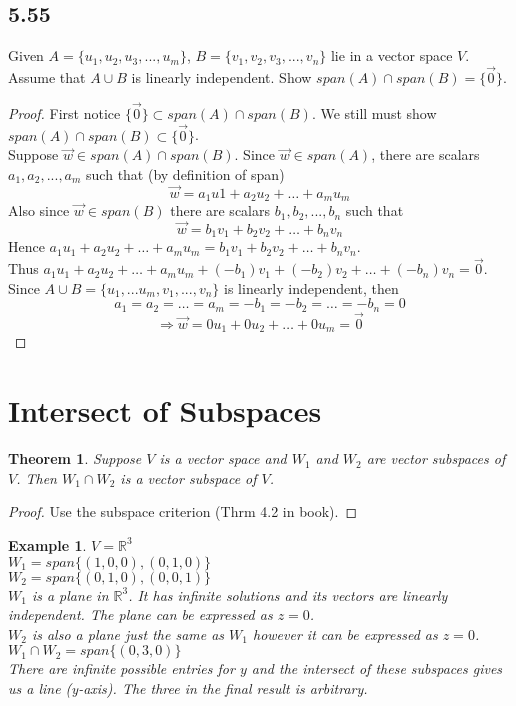 \documentclass{report}
\newtheorem*{ex}{Example}
\newtheorem*{thrm}{Theorem}
\begin{document}
\subsection{5.55}
Given $A=\{u_1,u_2,u_3,...,u_m\}$, $B=\{v_1,v_2,v_3,...,v_n\}$ lie in a vector space $V$. Assume that $A\cup B$ is linearly independent. Show $span(A)\cap span(B) = \{\vec{0}\}$.
\begin{proof}
First notice $\{\vec{0}\} \subset span(A) \cap span(B)$. We still must show $span(A) \cap span(B) \subset \{\vec{0}\}$.\\
Suppose $\vec{w}\in span(A) \cap span(B)$. Since $\vec{w}\in span(A)$, there are scalars $a_1,a_2,...,a_m$ such that (by definition of span)
\[ \vec{w}=a_1u1+a_2u_2+\dots+a_mu_m \] Also since $\vec{w}\in span(B)$ there are scalars $b_1,b_2,...,b_n$ such that 
\[ \vec{w}=b_1v_1+b_2v_2+\dots+b_nv_n \]
Hence $a_1u_1+a_2u_2+\dots+a_mu_m = b_1v_1+b_2v_2+\dots+b_nv_n$.\\
Thus $a_1u_1+a_2u_2+\dots+a_mu_m+(-b_1)v_1+(-b_2)v_2+\dots+(-b_n)v_n = \vec{0}$.\\
Since $A \cup B = \{u_1,...u_m,v_1,...,v_n\}$ is linearly independent, then
\[ a_1 = a_2 = \dots = a_m = -b_1 = -b_2 = \dots = -b_n = 0 \]
\[ \Rightarrow \vec{w}=0u_1+0u_2+\dots+0u_m=\vec{0} \]
\end{proof}

\section{Intersect of Subspaces}
\begin{thrm}
Suppose $V$ is a vector space and $W_1$ and $W_2$ are vector subspaces of $V$. Then $W_1\cap W_2$ is a vector subspace of $V$.
\end{thrm}
\begin{proof}
Use the subspace criterion (Thrm 4.2 in book).
\end{proof}
\begin{ex}
$V=\mathbb{R}^3$\\
$W_1 = span\{(1,0,0),(0,1,0)\}$\\
$W_2 = span\{(0,1,0),(0,0,1)\}$\\
$W_1$ is a plane in $\mathbb{R}^3$. It has infinite solutions and its vectors are linearly independent. The plane can be expressed as $z=0$.\\
$W_2$ is also a plane just the same as $W_1$ however it can be expressed as $z=0$.\\
$W_1 \cap W_2 = span\{(0,3,0)\}$\\
There are infinite possible entries for $y$ and the intersect of these subspaces gives us a line (y-axis). The three in the final result is arbitrary.
\end{ex}
\end{document}
